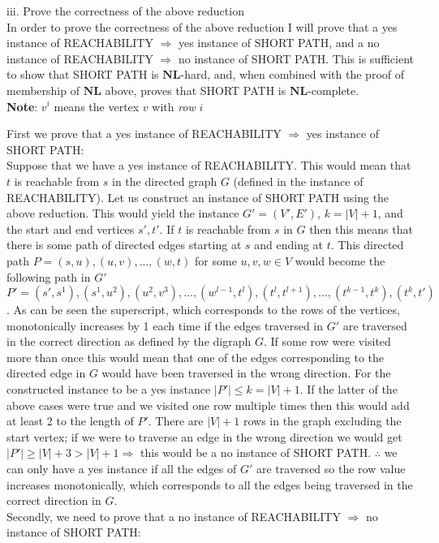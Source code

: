 \documentclass[12pt]{article}
\begin{document}
\begin{enumerate}
\begin{enumerate}
iii. Prove the correctness of the above reduction\\
In order to prove the correctness of the above reduction I will prove that a yes instance of REACHABILITY $\Rightarrow $ yes instance of SHORT PATH, and a no instance of REACHABILITY $\Rightarrow $ no instance of SHORT PATH. This is sufficient to show that SHORT PATH is $\textbf{NL}$-hard, and, when combined with the proof of membership of $\textbf{NL}$ above, proves that SHORT PATH is $\textbf{NL}$-complete.\\
\textbf{Note}: $v^i$ means the vertex $v$ with \textit{row} $i$

First we prove that a yes instance of REACHABILITY $\Rightarrow $ yes instance of SHORT PATH:\\
Suppose that we have a yes instance of REACHABILITY. This would mean that $t$ is reachable from $s$ in the directed graph $G$ (defined in the instance of REACHABILITY). Let us construct an instance of SHORT PATH using the above reduction. This would yield the instance $G'=(V',E')$, $k=|V|+1$, and the start and end vertices $s',t'$. If $t$ is reachable from $s$ in $G$ then this means that there is some path of directed edges starting at $s$ and ending at $t$. This directed path $P=(s,u),(u,v),...,(w,t)$ for some $u,v,w \in V$ would become the following path in $G'$ $P'=(s',s^1),(s^1,u^2),(u^2,v^3),...,(w^{l-1},t^l),(t^l,t^{l+1}),...,(t^{k-1},t^k),(t^k,t')$. As can be seen the superscript, which corresponds to the rows of the vertices, monotonically increases by 1 each time if the edges traversed in $G'$ are traversed in the correct direction as defined by the digraph $G$. If some row were visited more than once this would mean that one of the edges corresponding to the directed edge in $G$ would have been traversed in the wrong direction. For the constructed instance to be a yes instance $|P'|\leq k =|V|+1$. If the latter of the above cases were true and we visited one row multiple times then this would add at least 2 to the length of $P'$. There are $|V|+1$ rows in the graph excluding the start vertex; if we were to traverse an edge in the wrong direction we would get $|P'| \geq |V|+3 > |V|+1 \Rightarrow$ this would be a no instance of SHORT PATH. $\therefore$ we can only have a yes instance if all the edges of $G'$ are traversed so the row value increases monotonically, which corresponds to all the edges being traversed in the correct direction in $G$. \\
Secondly, we need to prove that a no instance of REACHABILITY $\Rightarrow$ no instance of SHORT PATH: \\

\end{enumerate}
\end{enumerate}
\end{document}
